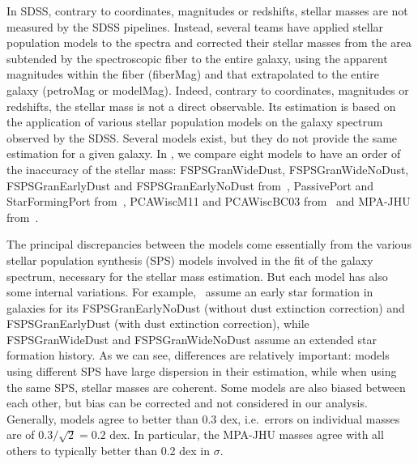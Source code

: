 In SDSS, contrary to coordinates, magnitudes or redshifts, stellar masses are
not measured by the SDSS pipelines. Instead, several teams have applied stellar
population models to the spectra and corrected their stellar masses from the
area subtended by the spectroscopic fiber to the entire galaxy, using the
apparent magnitudes within the fiber (fiberMag) and that extrapolated to the
entire galaxy (petroMag or modelMag). Indeed, contrary to coordinates,
magnitudes or redshifts, the stellar mass is not a direct observable. Its
estimation is based on the application of various stellar population models on
the galaxy spectrum observed by the SDSS\@. Several models exist, but they do
not provide the same estimation for a given galaxy. In
, we compare eight models to have an order
of the inaccuracy of the stellar mass: FSPSGranWideDust, FSPSGranWideNoDust,
FSPSGranEarlyDust and FSPSGranEarlyNoDust from~\cite{Conroy+09}, PassivePort
and StarFormingPort from~\cite{Maraston+09}, PCAWiscM11 and PCAWiscBC03
from~\cite{Chen+12} and MPA-JHU from~\cite{Brinchmann+04, Kauffmann+03,
Tremonti+04}.

The principal discrepancies between the models come essentially from the
various stellar population synthesis (SPS) models involved in the fit of the
galaxy spectrum, necessary for the stellar mass estimation. But each model has
also some internal variations. For example,~\cite{Conroy+09} assume an early
star formation in galaxies for its FSPSGranEarlyNoDust (without dust extinction
correction) and FSPSGranEarlyDust (with dust extinction correction), while
FSPSGranWideDust and FSPSGranWideNoDust assume an extended star formation
history. As we can see, differences are relatively important: models using
different SPS have large dispersion in their estimation, while when using the
same SPS, stellar masses are coherent. Some models are also biased between each
other, but bias can be corrected and not considered in our analysis. Generally,
models agree to better than 0.3 dex, i.e.\ errors on individual masses are of
$0.3 / \sqrt{2} = 0.2$ dex. In particular, the MPA-JHU masses agree with all
others to typically better than 0.2 dex in $\sigma$.

